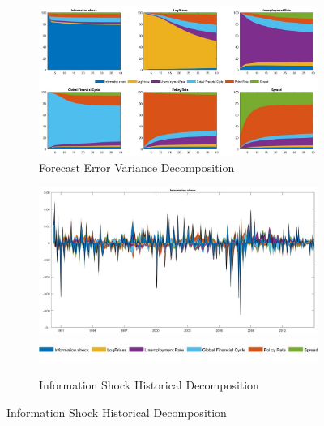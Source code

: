 \documentclass[11pt,a4paper]{article}
\begin{document}
    \begin{figure}[hp]
        \centering

        \begin{subfigure}{\textwidth}
            \centering
            \includegraphics[scale=.32]{Graphs/forecast_err_variance_decomp_3lags.jpg}
            \captionsetup{font=scriptsize}
            \caption{Forecast Error Variance Decomposition}
            \label{fig:fevd}
        \end{subfigure}
        
        \vspace{0.2cm} %
        
        \begin{subfigure}{\textwidth}
            \centering
            \includegraphics[scale=.32]{Graphs/INFO_FF4_HD_3lags.jpg}
            \includegraphics*[scale=0.21]{Graphs/Inkedlegend.jpg}
            \captionsetup{font=scriptsize}
            \caption{Information Shock Historical Decomposition}
            \label{fig:INFOhd}
        \end{subfigure}


\end{figure}
\end{document}
